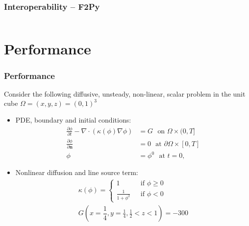\documentclass{beamer}
\begin{document}
\begin{frame}
  \frametitle{Interoperability -- \textbf{F2Py}}
  \scriptsize
  \inputminted[linenos]{fortran}{wrap_f2py.pyf}
\end{frame}


\section{Performance}

\newcommand{\onehalf}{\frac{1}{2}}
\newcommand{\pder}[2]{\ensuremath{\frac{\partial#1}{\partial#2}}}

\begin{frame}
  \frametitle{Performance}
  Consider the following diffusive, unsteady, non-linear, scalar
  problem in the unit cube $\Omega=(x,y,z)=(0,1)^3$
  \begin{itemize}
  \item PDE, boundary and initial conditions:
    \begin{equation}
      \begin{aligned}
        \pder{\phi}{t}-\nabla \cdot \left(\kappa(\phi)\nabla \phi \right) &= G
        ~~~\text{on $\Omega \times (0,T]$}\\
        \pder{\phi}{\mathbf{n}} &= 0 
        ~~~\text{at $\partial\Omega \times [0,T]$}\\
        \phi &= \phi^0
        ~~~\text{at $t=0$},
      \end{aligned}
    \end{equation}
  \item Nonlinear diffusion and line source term:
    \begin{equation} 
      \begin{aligned}
        \kappa(\phi)=
        \begin{cases}
          1 ~~~&\text{if } \phi \ge 0 \\
          \frac{1}{1+\phi^2} ~~~&\text{if } \phi < 0
        \end{cases}\\
        G(x=\dfrac{1}{4},y=\frac{1}{4},\frac{1}{2}<z<1) = -300
      \end{aligned}
    \end{equation}
  \end{itemize}
\end{frame}
\end{document}
